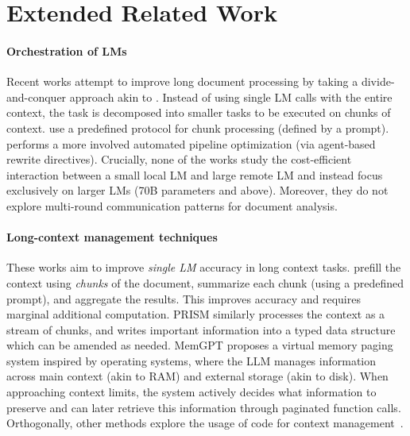 \section{Extended Related Work}
\label{app:related-work}





\paragraph{Orchestration of LMs }
Recent works attempt to improve long document processing by taking a divide-and-conquer approach akin to \system. Instead of using single LM calls with the entire context, the task is decomposed into smaller tasks to be executed on chunks of context. \citep{zhang2024chain, zhou2024llm} use a predefined protocol for chunk processing (defined by a prompt). \citep{shankar2024docetl} performs a more involved automated pipeline optimization (via agent-based rewrite directives). Crucially, none of the works study the cost-efficient interaction between a small local LM and large remote LM and instead focus exclusively on larger LMs (70B parameters and above). Moreover, they do not explore multi-round communication patterns for document analysis. 

\paragraph{Long-context management techniques} These works aim to improve \emph{single LM} accuracy in long context tasks. \citep{russak2024writing} prefill the context using \emph{chunks} of the document, summarize each chunk (using a predefined prompt), and aggregate the results. This improves accuracy and requires marginal additional computation. PRISM similarly \citep{jayalath2024long} processes the context as a stream of chunks, and writes important information into a typed data structure which can be amended as needed. MemGPT \citep{packer2023memgpt} proposes a virtual memory paging system inspired by operating systems, where the LLM manages information across main context (akin to RAM) and external storage (akin to disk). When approaching context limits, the system actively decides what information to preserve and can later retrieve this information through paginated function calls. Orthogonally, other methods explore the usage of code for context management~\citep{arora2023evaporate}.

